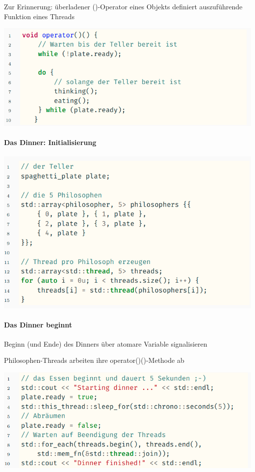 \documentclass[10pt]{article}
\begin{document}
  \begin{itemize*}
    \item Zur Erinnerung: überladener ()-Operator eines Objekts definiert auszuführende Funktion eines Threads
  \end{itemize*}
  \begin{center}
    \includegraphics[width=0.4\linewidth]{Assets/Programmierparadigmen-code-snippet-31}
  \end{center}
  
  \paragraph{Das Dinner: Initialisierung}
  
  \begin{center}
    \includegraphics[width=0.7\linewidth]{Assets/Programmierparadigmen-code-snippet-32}
  \end{center}
  
  \paragraph{Das Dinner beginnt}
  
  \begin{itemize*}
    \item Beginn (und Ende) des Dinners über atomare Variable signalisieren
    \item Philosophen-Threads arbeiten ihre operator()()-Methode ab
  \end{itemize*}
  \begin{center}
    \includegraphics[width=0.4\linewidth]{Assets/Programmierparadigmen-code-snippet-33}
  \end{center}
  
\end{document}
